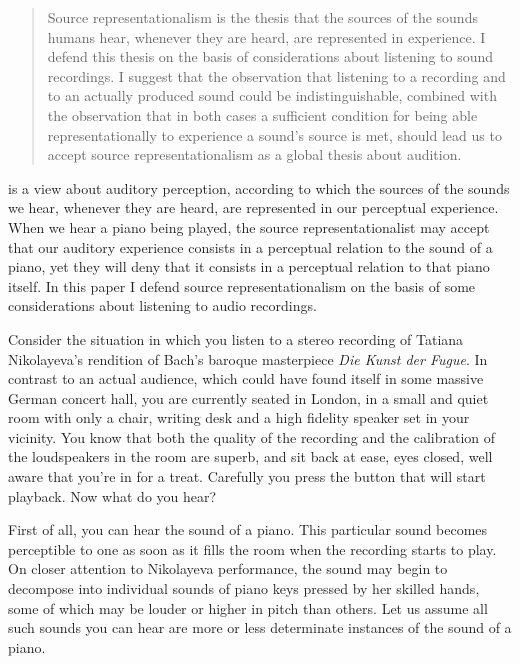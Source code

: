 \documentclass[sloppy, journal, git, bytitle, dodraft]{humapap}
\begin{document}
\documenttitle

\begin{abstract}
Source representationalism is the thesis that the sources of the sounds humans hear, whenever they are heard, are represented in experience. I defend this thesis on the basis of considerations about listening to sound recordings. I suggest that the observation that listening to a recording and to an actually produced sound could be indistinguishable, combined with the observation that in both cases a sufficient condition for being able representationally to experience a sound's source is met, should lead us to accept source representationalism as a global thesis about audition. 
\end{abstract}	

 is a view about auditory perception, according to which the sources of the sounds we hear, whenever they are heard, are represented in our perceptual experience. When we hear a piano being played, the source representationalist may accept that our auditory experience consists in a perceptual relation to the sound of a piano, yet they will deny that it consists in a perceptual relation to that piano itself. In this paper I defend source representationalism on the basis of some considerations about listening to audio recordings.

\sect Consider the situation in which you listen to a stereo recording of Tatiana Nikolayeva's rendition of Bach's baroque masterpiece \emph{Die Kunst der Fugue}. In contrast to an actual audience, which could have found itself in some massive German concert hall, you are currently seated in London, in a small and quiet room with only a chair, writing desk and a high fidelity speaker set in your vicinity. You know that both the quality of the recording and the calibration of the loudspeakers in the room are superb, and sit back at ease, eyes closed, well aware that you're in for a treat. Carefully you press the button that will start playback. Now what do you hear? 

\sect First of all, you can hear the sound of a piano. This particular sound becomes perceptible to one as soon as it fills the room when the recording starts to play. On closer attention to Nikolayeva performance, the sound may begin to decompose into individual sounds of piano keys pressed by her skilled hands, some of which may be louder or higher in pitch than others. Let us assume all such sounds you can hear are more or less determinate instances of the sound of a piano.
\end{document}
